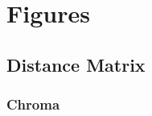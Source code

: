 \documentclass{article} %
\begin{document}
% 











\clearpage
\appendix
\section{Figures}

\subsection{Distance Matrix}
\subsubsection{Chroma}




% 
\end{document}
